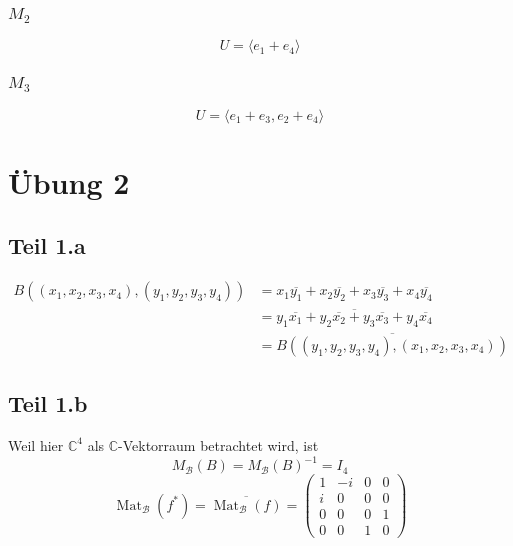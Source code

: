 \documentclass[10pt,a4paper]{article}
\DeclareMathOperator{\Mat}{Mat}
\begin{document}
\subsubsection*{$M_{2}$}

\begin{equation}
U = \langle e_{1} + e_{4} \rangle
\end{equation}

\subsubsection*{$M_{3}$}

\begin{equation}
U = \langle e_{1} + e_{3}, e_{2} + e_{4} \rangle
\end{equation}

\section*{Übung 2}

\subsection*{Teil 1.a}

\begin{align*}
B((x_{1}, x_{2}, x_{3}, x_{4}), (y_{1}, y_{2}, y_{3}, y_{4})) & = x_{1}\overline{y_{1}} + x_{2}\overline{y_{2}} + x_{3}\overline{y_{3}} + x_{4}\overline{y_{4}}\\
& = \overline{y_{1}\overline{x_{1}} + y_{2}\overline{x_{2}} + y_{3}\overline{x_{3}} + y_{4}\overline{x_{4}}}\\
& = \overline{B((y_{1}, y_{2}, y_{3}, y_{4}), (x_{1}, x_{2}, x_{3}, x_{4}))}
\end{align*}

\subsection*{Teil 1.b}

Weil hier $\mathbb{C}^{4}$ als $\mathbb{C}$-Vektorraum betrachtet wird, ist
\begin{equation}
M_{\mathcal{B}}(B) = M_{\mathcal{B}}(B)^{-1} = I_{4}
\end{equation}
\begin{equation}
\Mat_{\mathcal{B}}(f^{*}) = \overline{\Mat_{\mathcal{B}}(f)} = \begin{pmatrix}
1 & -i & 0 & 0\\
i & 0 & 0 & 0\\
0 & 0 & 0 & 1\\
0 & 0 & 1 & 0
\end{pmatrix}
\end{equation}
\end{document}
